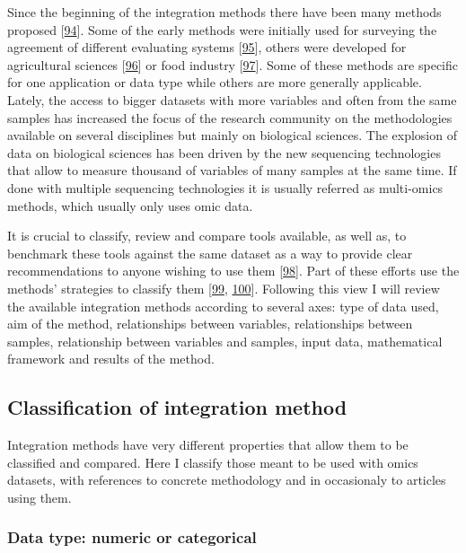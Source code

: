 \documentclass[
  a4paper,
]{book}
\begin{document}
Since the beginning of the integration methods there have been many methods proposed {[}\protect\hyperlink{ref-krassowski2020}{94}{]}.
Some of the early methods were initially used for surveying the agreement of different evaluating systems {[}\protect\hyperlink{ref-yannakoudakis2015}{95}{]}, others were developed for agricultural sciences {[}\protect\hyperlink{ref-hotelling_relations_1936}{96}{]} or food industry {[}\protect\hyperlink{ref-biancolillo}{97}{]}.
Some of these methods are specific for one application or data type while others are more generally applicable.
Lately, the access to bigger datasets with more variables and often from the same samples has increased the focus of the research community on the methodologies available on several disciplines but mainly on biological sciences.
The explosion of data on biological sciences has been driven by the new sequencing technologies that allow to measure thousand of variables of many samples at the same time.
If done with multiple sequencing technologies it is usually referred as multi-omics methods, which usually only uses omic data.

It is crucial to classify, review and compare tools available, as well as, to benchmark these tools against the same dataset as a way to provide clear recommendations to anyone wishing to use them {[}\protect\hyperlink{ref-wu_selective_2019}{98}{]}.
Part of these efforts use the methods' strategies to classify them {[}\protect\hyperlink{ref-cavill2016}{99}, \protect\hyperlink{ref-chongComputationalApproachesIntegrative2017}{100}{]}.
Following this view I will review the available integration methods according to several axes: type of data used, aim of the method, relationships between variables, relationships between samples, relationship between variables and samples, input data, mathematical framework and results of the method.

\hypertarget{classification-of-integration-method}{%
\subsection{Classification of integration method}\label{classification-of-integration-method}}

Integration methods have very different properties that allow them to be classified and compared.
Here I classify those meant to be used with omics datasets, with references to concrete methodology and in occasionaly to articles using them.

\hypertarget{data-type-numeric-or-categorical}{%
\subsubsection{Data type: numeric or categorical}\label{data-type-numeric-or-categorical}}
\end{document}
